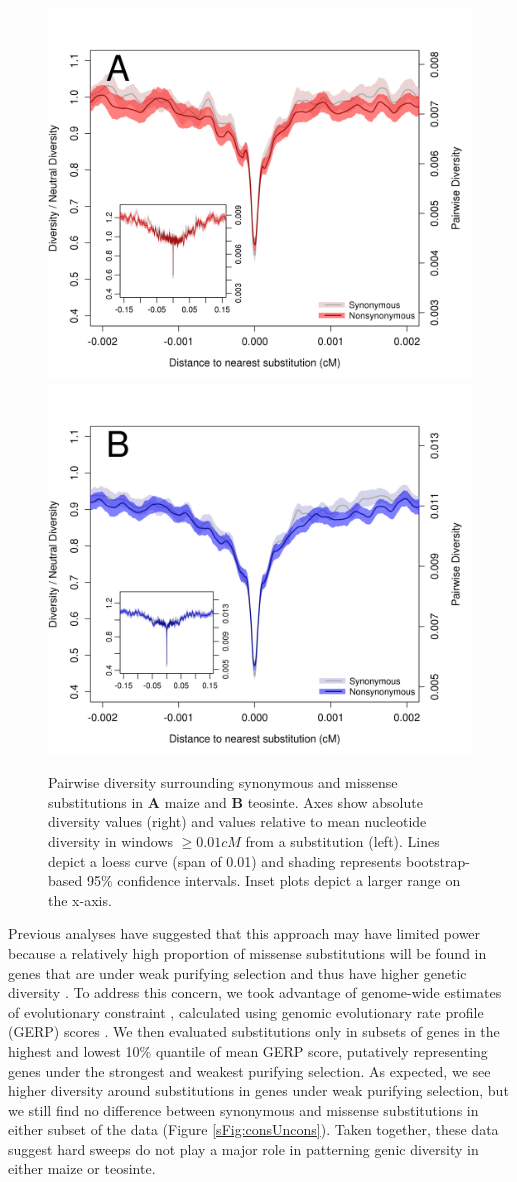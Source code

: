 \documentclass{pnastwo}
\begin{document}
\begin{article}
\begin{figure}
\centering
\includegraphics[width=.45\textwidth]{FigsAndFiles/plotDiversity_TvM_Folded2_Significance_Aug}
\hspace{0.05\textwidth} \includegraphics[width=.45\textwidth]{FigsAndFiles/plotDiversity_TvT_Folded2_Significance_Aug}
\caption{Pairwise diversity surrounding synonymous and missense  substitutions in {\bf A} maize and {\bf B} teosinte. Axes show absolute diversity values (right) and values relative to mean nucleotide diversity in windows $\geq 0.01 cM$ from a substitution (left).  Lines depict a loess curve (span of 0.01) and shading represents bootstrap-based 95\% confidence intervals. Inset plots depict a larger range on the x-axis. \label{fig:hardSweeps}}
\end{figure}

Previous analyses have suggested that this approach may have limited power because a relatively high proportion of missense substitutions will be found in genes that are under weak purifying selection and thus have higher genetic diversity \cite{enard2014}. 
To address this concern, we took advantage of genome-wide estimates of evolutionary constraint \cite{rodgers2015}, calculated using genomic evolutionary rate profile (GERP) scores \cite{davydov2010}. 
We then evaluated substitutions only in subsets of genes in the highest and lowest 10\% quantile of mean GERP score, putatively representing genes under the strongest and weakest purifying selection. 
As expected, we see higher diversity around substitutions in genes under weak purifying selection, but we still find no difference between synonymous and missense substitutions in either subset of the data (Figure \ref{sFig:consUncons}).
Taken together, these data suggest hard sweeps do not play a major role in patterning genic diversity in either maize or teosinte.


\end{article}
\end{document}
